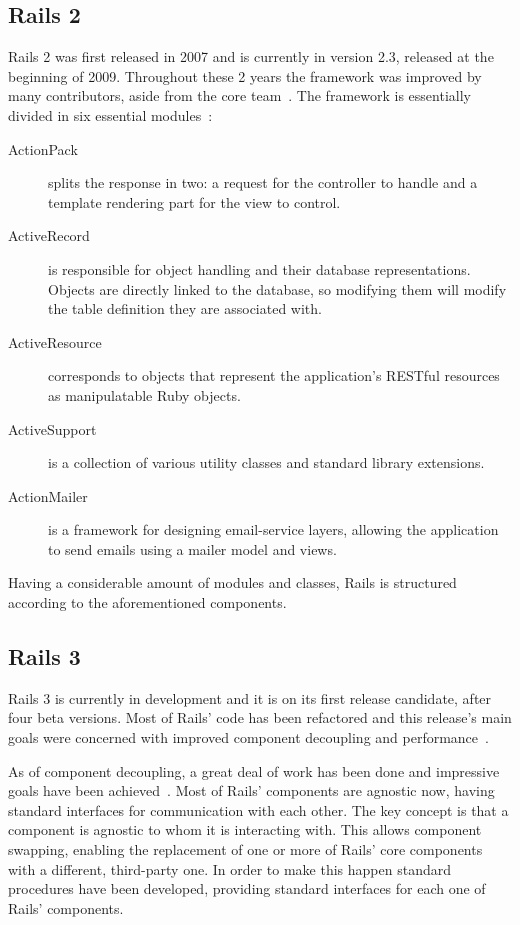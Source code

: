 \subsection{Rails 2}
\label{tech:sec:ruby_on_rails:rails2}
Rails 2 was first released in 2007 and is currently in version 2.3, released at the beginning of 2009. Throughout these 2 years the framework was improved by many contributors, aside from the core team~\cite{rails_core_team}. The framework is essentially divided in six essential modules~\cite{ruby_on_rails_principles, rails23_release_notes}:
\begin{description}
\item[ActionPack] splits the response in two:  a request for the controller to handle and a template rendering part for the view to control.
\item[ActiveRecord] is responsible for object handling and their database representations. Objects are directly linked to the database, so modifying them will modify the table definition they are associated with.
\item[ActiveResource] corresponds to objects that represent the application's RESTful resources as manipulatable Ruby objects.
\item[ActiveSupport] is a collection of various utility classes and standard library extensions.
\item[ActionMailer] is a framework for designing email-service layers, allowing the application to send emails using a mailer model and views.
\end{description}
Having a considerable amount of modules and classes, Rails is structured according to the aforementioned components.


\subsection{Rails 3}
\label{tech:sec:ruby_on_rails:rails3}
Rails 3 is currently in development and it is on its first release candidate, after four beta versions. Most of Rails' code has been refactored and this release's main goals were concerned with improved component decoupling and performance~\cite{rails3_great_decoupling}. 

As of component decoupling, a great deal of work has been done and impressive goals have been achieved~\cite{vaporware_to_awesome}. Most of Rails' components are agnostic now, having standard interfaces for communication with each other. The key concept is that a component is agnostic to whom it is interacting with. This allows component swapping, enabling the replacement of one or more of Rails' core components with a different, third-party one. In order to make this happen standard procedures have been developed, providing standard interfaces for each one of Rails' components.

